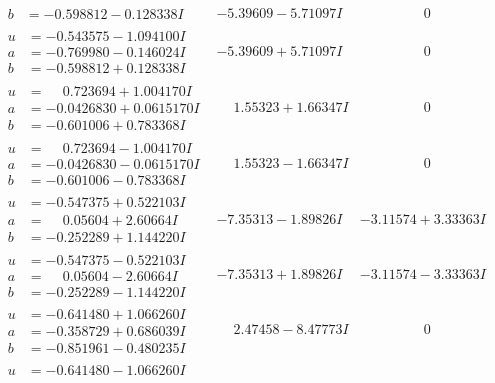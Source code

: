 \documentclass[1p]{elsarticle_modified}
\theoremstyle{definition}
\begin{document}
$$\begin{array}{c|c|c}
\begin{aligned}
b &= -0.598812 - 0.128338 I\end{aligned}
 & -5.39609 - 5.71097 I & \phantom{-0.000000 } 0 \\ \hline\begin{aligned}
u &= -0.543575 - 1.094100 I \\
a &= -0.769980 - 0.146024 I \\
b &= -0.598812 + 0.128338 I\end{aligned}
 & -5.39609 + 5.71097 I & \phantom{-0.000000 } 0 \\ \hline\begin{aligned}
u &= \phantom{-}0.723694 + 1.004170 I \\
a &= -0.0426830 + 0.0615170 I \\
b &= -0.601006 + 0.783368 I\end{aligned}
 & \phantom{-}1.55323 + 1.66347 I & \phantom{-0.000000 } 0 \\ \hline\begin{aligned}
u &= \phantom{-}0.723694 - 1.004170 I \\
a &= -0.0426830 - 0.0615170 I \\
b &= -0.601006 - 0.783368 I\end{aligned}
 & \phantom{-}1.55323 - 1.66347 I & \phantom{-0.000000 } 0 \\ \hline\begin{aligned}
u &= -0.547375 + 0.522103 I \\
a &= \phantom{-}0.05604 + 2.60664 I \\
b &= -0.252289 + 1.144220 I\end{aligned}
 & -7.35313 - 1.89826 I & -3.11574 + 3.33363 I \\ \hline\begin{aligned}
u &= -0.547375 - 0.522103 I \\
a &= \phantom{-}0.05604 - 2.60664 I \\
b &= -0.252289 - 1.144220 I\end{aligned}
 & -7.35313 + 1.89826 I & -3.11574 - 3.33363 I \\ \hline\begin{aligned}
u &= -0.641480 + 1.066260 I \\
a &= -0.358729 + 0.686039 I \\
b &= -0.851961 - 0.480235 I\end{aligned}
 & \phantom{-}2.47458 - 8.47773 I & \phantom{-0.000000 } 0 \\ \hline\begin{aligned}
u &= -0.641480 - 1.066260 I \\

\end{aligned}
\end{array}$$
\end{document}
